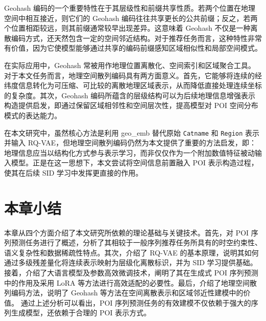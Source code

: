 Geohash 编码的一个重要特性在于其层级性和前缀共享性质。若两个位置在地理空间中相互接近，则它们的 Geohash 编码往往共享更长的公共前缀；反之，若两个位置相距较远，则其前缀通常较早出现差异。这意味着 Geohash 不仅是一种离散编码方式，还天然包含一定的空间邻近结构。对于推荐任务而言，这种特性非常有价值，因为它使模型能够通过共享的编码前缀感知区域相似性和局部空间模式。

在实际应用中，Geohash 常被用作地理位置离散化、空间索引和区域聚合工具。对于本文任务而言，地理空间散列编码具有两方面意义。首先，它能够将连续的经纬度信息转化为可压缩、可比较的离散地理区域表示，从而降低直接处理连续坐标的复杂度。其次，Geohash 编码所蕴含的层级结构可以为后续地理信息增强表示构造提供启发，即通过保留区域相邻性和空间层次性，提高模型对 POI 空间分布模式的表达能力。



在本文研究中，虽然核心方法是利用 geo\_emb 替代原始 \texttt{Catname} 和 \texttt{Region} 表示并输入 RQ-VAE，但地理空间散列编码仍然为本文提供了重要的方法启发，即：地理信息应当以结构化方式参与表示学习，而非仅仅作为一个附加数值特征被动输入模型。正是在这一思想下，本文尝试将空间信息前置融入 POI 表示构造过程，使其在后续 SID 学习中发挥更直接的作用。

\section{本章小结}
\label{sec:theory_summary}

本章从四个方面介绍了本文研究所依赖的理论基础与关键技术。首先，对 POI 序列预测任务进行了概述，分析了其相较于一般序列推荐任务所具有的时空约束性、语义复杂性和数据稀疏性特点。其次，介绍了 RQ-VAE 的基本原理，说明其如何通过多级残差量化将连续表示映射为层级化离散标识，并为 SID 学习提供基础。接着，介绍了大语言模型及参数高效微调技术，阐明了其在生成式 POI 序列预测中的作用及采用 LoRA 等方法进行高效适配的必要性。最后，介绍了地理空间散列编码方法，说明了 Geohash 等方法在空间离散表示和区域邻近性建模中的价值。
通过上述分析可以看出，POI 序列预测任务的有效建模不仅依赖于强大的序列生成模型，还依赖于合理的 POI 表示方式。

